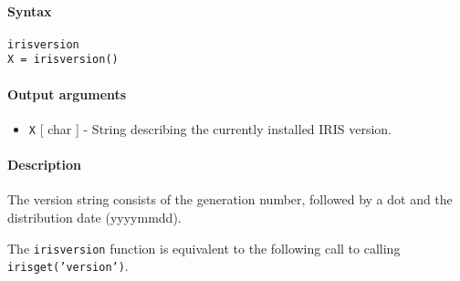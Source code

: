 


	\paragraph{Syntax}

\begin{verbatim}
irisversion
X = irisversion()
\end{verbatim}

\paragraph{Output arguments}

\begin{itemize}
\itemsep1pt\parskip0pt
\item
  \texttt{X} {[} char {]} - String describing the currently installed
  IRIS version.
\end{itemize}

\paragraph{Description}

The version string consists of the generation number, followed by a dot
and the distribution date (yyyymmdd).

The \texttt{irisversion} function is equivalent to the following call to
calling \texttt{irisget('version')}.


